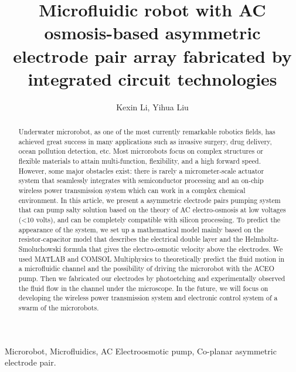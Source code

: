 \documentclass[journal,svgnames,twocolumn,x11names]{IEEEtran}
\begin{document}
\title{Microfluidic robot with AC osmosis-based asymmetric electrode pair array fabricated by integrated circuit technologies}
\author{Kexin Li, Yihua Liu}


\maketitle
\begin{abstract}
Underwater microrobot, as one of the most currently remarkable robotics fields, has achieved great success in many applications such as invasive surgery, drug delivery\cite{nelson2010}, ocean pollution detection, etc. Most microrobots focus on complex structures or flexible materials to attain multi-function, flexibility, and a high forward speed. However, some major obstacles exist: there is rarely a micrometer-scale actuator system that seamlessly integrates with semiconductor processing\cite{Miskin2020} and an on-chip wireless power transmission system which can work in a complex chemical environment. In this article, we present a asymmetric electrode pairs pumping system that can pump salty solution based on the theory of AC electro-osmosis\cite{Brown2000}\cite{Garcia2006}\cite{ramos2003} at low voltages (\textless 10 volts), and can be completely compatible with silicon processing. To predict the appearance of the system, we set up a mathematical model mainly based on the resistor-capacitor model that describes the electrical double layer and the Helmholtz-Smoluchowski formula that gives the electro-osmotic velocity above the electrodes\cite{Castellanos2003}. We used MATLAB and COMSOL Multiphysics to theoretically predict the fluid motion in a microfluidic channel and the possibility of driving the microrobot with the ACEO pump. Then we fabricated our electrodes by photoetching and experimentally observed the fluid flow in the channel under the microscope. In the future, we will focus on developing the wireless power transmission system and electronic control system of a swarm of the microrobots.
\end{abstract}

\begin{IEEEkeywords}
Microrobot, Microfluidics, AC Electroosmotic pump, Co-planar asymmetric electrode pair.
\end{IEEEkeywords}

\end{document}
